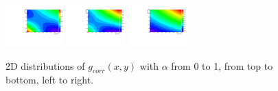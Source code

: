 \begin{figure}[h]
\includegraphics[width=0.2\textwidth]{figures/sec-background/correlation/res_th2F_exp_th2f_res_alpha_08_n005.pdf}
\includegraphics[width=0.2\textwidth]{figures/sec-background/correlation/res_th2F_exp_th2f_res_alpha_09_n005.pdf}
\includegraphics[width=0.2\textwidth]{figures/sec-background/correlation/res_th2F_exp_th2f_res_alpha_10_n005.pdf}
  \caption{2D distributions of $g_{corr}(x,y)$ with $\alpha$ from 0 to 1, from top to bottom, left to right.}
  \label{fig:gcorr_alpha}
\end{figure}

